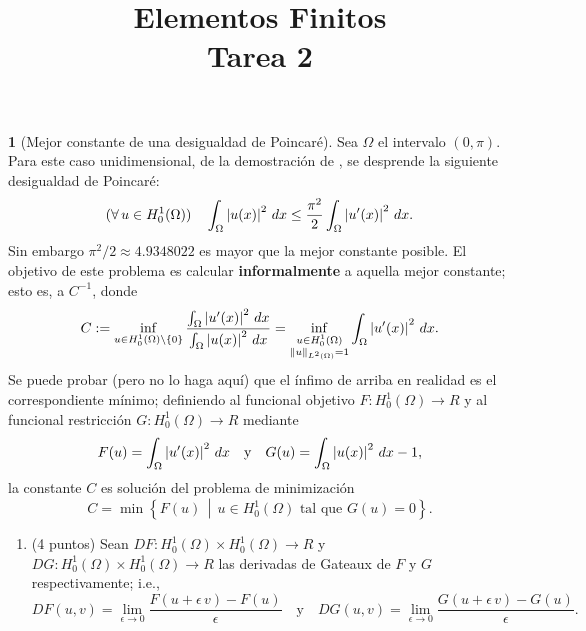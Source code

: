 \documentclass[10pt,a4paper]{report}
\title{\color{azul}\textbf{Elementos Finitos}\\
	\textbf{Tarea 2}}
\author{\color{azul}\autor}
\date{\color{azul}}
\newcommand{\abs}[2][y]{\if#1y\left\fi\lvert#2\if#1y\right\fi\rvert}
\newcommand{\norm}[2][y]{{\if#1y\left\fi\lVert#2\if#1y\right\fi\rVert}}
\newcommand{\dd}{\,d}
\newcommand{\Real}{R}
\theoremstyle{definition}
\newtheorem{problem}{\color{azul}{Problema}}
\renewcommand{\theproblem}{\Alph{problem}}
\numberwithin{equation}{problem}
\providecommand{\abs}[1]{\left\lvert#1\right\rvert}
\providecommand{\norm}[1]{\left\lVert#1\right\rVert}
\begin{document}
	\begin{problem}[Mejor constante de una desigualdad de Poincaré]
		Sea $\Omega$ el intervalo $(0,\pi)$.
		Para este caso unidimensional, de la demostración de \cite[Lem.~10.2(iii)]{Tartar}, se desprende la siguiente desigualdad de Poincaré:
		\begin{equation*}
			(\forall\,u\in H^1_0(\Omega)) \quad
			\int_\Omega \abs{u(x)}^2 \dd x \leq \frac{\pi^2}{2} \int_\Omega \abs{u'(x)}^2 \dd x.
		\end{equation*}
		Sin embargo $\pi^2/2 \approx 4.9348022$ es mayor que la mejor constante posible.
		El objetivo de este problema es calcular \textbf{informalmente} a aquella mejor constante; esto es, a $C^{-1}$, donde
		\begin{equation*}
			C := \inf_{u\in H^1_0(\Omega)\setminus\{0\}} \frac{\int_\Omega \abs{u'(x)}^2 \dd x}{\int_\Omega \abs{u(x)}^2 \dd x}
			= \inf_{\substack{u\in H^1_0(\Omega)\\\norm{u}_{L^2(\Omega)}=1}} \int_\Omega \abs{u'(x)}^2 \dd x.
		\end{equation*}
		Se puede probar (pero no lo haga aquí) que el ínfimo de arriba en realidad es el correspondiente mínimo; definiendo al funcional objetivo $F \colon H^1_0(\Omega) \to \Real$ y al funcional restricción $G \colon H^1_0(\Omega) \to \Real$ mediante
		\begin{equation*}
			F(u) = \int_\Omega \abs{u'(x)}^2 \dd x \quad\text{y}\quad G(u) = \int_\Omega \abs{u(x)}^2 \dd x - 1,
		\end{equation*}
		la constante $C$ es solución del problema de minimización
		\begin{equation}\label{IDM}\tag{\S}
			C = \min \left\{ F(u) \,\middle|\, u \in H^1_0(\Omega) \text{ tal que } G(u) = 0 \right\}.
		\end{equation}
		\begin{enumerate}[label=\textbf{\theproblem.\Roman{*}.},ref=\theproblem.\Roman{*},parsep=1ex]
			\item\label{q:GateauxDerivatives} (4 puntos) Sean $DF \colon H^1_0(\Omega) \times H^1_0(\Omega) \to \Real$ y $DG \colon H^1_0(\Omega) \times H^1_0(\Omega) \to \Real$ las derivadas de Gateaux de $F$ y $G$ respectivamente; i.e.,
			\begin{equation*}
				DF(u,v) = \lim_{\epsilon\to 0} \frac{F(u + \epsilon \, v) - F(u)}{\epsilon}
				\quad\text{y}\quad
				DG(u,v) = \lim_{\epsilon\to 0} \frac{G(u + \epsilon \, v) - G(u)}{\epsilon}.
			\end{equation*}

\end{enumerate}
\end{problem}
\end{document}
